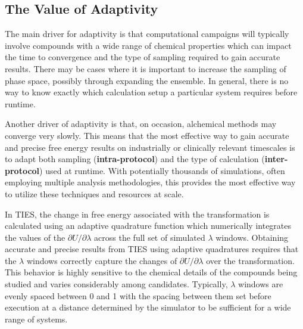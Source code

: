 %


\subsection{The Value of Adaptivity}\label{ssec:adapt_ties}

The main driver for adaptivity is that computational campaigns will typically
involve compounds with a wide range of chemical properties which can impact
the time to convergence and the type of sampling required to gain accurate 
results. There may be cases where it is important to increase the sampling of 
phase space, possibly through expanding the ensemble. In general, there is no 
way to know exactly which calculation setup a particular system requires before 
runtime.

Another driver of adaptivity is that, on occasion, alchemical methods may
converge very slowly. 
This means that the most effective way to gain accurate and precise free
energy results on industrially or clinically relevant timescales is 
to adapt both sampling (\textbf{intra-protocol}) and the type of calculation
(\textbf{inter-protocol}) used at runtime. With potentially thousands of
simulations, often employing multiple analysis methodologies, this provides
the most effective way to utilize these techniques and resources at scale.

In TIES, the change in free energy associated with the transformation is
calculated using an adaptive quadrature function which numerically integrates
the values of the $\partial U/\partial\lambda$ across the full set of
simulated $\lambda$ windows. Obtaining accurate and precise results from TIES
using adaptive quadratures requires that the $\lambda$ windows correctly
capture the changes of $\partial U/\partial\lambda$ over the transformation.
This behavior is highly sensitive to the chemical details of the compounds
being studied and varies considerably among candidates. Typically,
$\lambda$ windows are evenly spaced between 0 and 1 with the spacing between
them set before execution at a distance determined by the simulator to be
sufficient for a wide range of systems.

